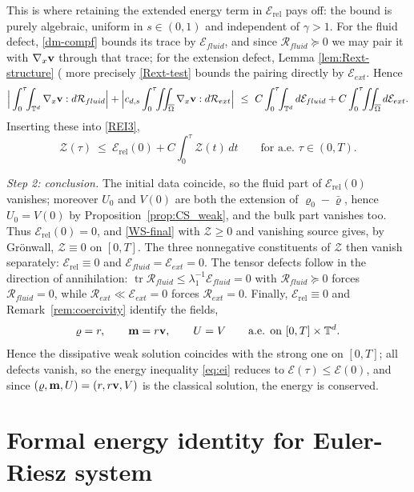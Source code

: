\documentclass[12pt,a4paper,twoside]{article}
\newcommand{\vr}{\varrho}
\newcommand{\vv}{\vc{v}}
\newcommand{\vc}[1]{{\bf #1}}
\newcommand{\Erel}{\mathcal{E}_{\mathrm{rel}}}
\numberwithin{equation}{section}%
\newcommand{\vm}{\vc{m}}
\newcommand{\Gradx}{\nabla_x}
\begin{document}
\begin{pf}
This is where retaining the extended energy term in $\Erel$ pays off: the bound is purely algebraic, uniform in $s\in(0,1)$ and independent of $\gamma>1$. For the fluid defect, \eqref{dm-compf} bounds its trace by
$\mathcal E_{fluid}$, and since $\mathcal R_{fluid}\succeq0$ we may pair it with $\Gradx\vv$ through
that trace; for the extension defect, Lemma \ref{lem:Rext-structure} ( more precisely \eqref{Rext-test} bounds the pairing directly by
$\mathcal E_{ext}$. Hence
\[
\Big|\int_0^\tau\!\!\int_{\mathbb T^d}\Gradx\vv:d\mathcal R_{fluid}\Big|
+\Big|c_{d,s}\int_0^\tau\!\!\iint_{\overline\Omega}\Gradx\vv:d\mathcal R_{ext}\Big|
\ \le\ C\int_0^\tau\!\!\int_{\mathbb T^d}d\mathcal E_{fluid}+C\int_0^\tau\!\!\iint_{\overline\Omega}d\mathcal E_{ext}.
\]
Inserting these into \eqref{REI3},
\begin{equation}\label{WS-final}
	\mathcal Z(\tau)\ \le\ \Erel(0)+C\int_0^\tau\mathcal Z(t)\,dt
	\qquad\text{for a.e. }\tau\in(0,T).
\end{equation}

\emph{Step 2: conclusion.} The initial data coincide, so the fluid part of $\Erel(0)$ vanishes; moreover
$U_0$ and $V(0)$ are both the extension of $\vr_0-\bar\vr$, hence $U_0=V(0)$ by
Proposition~\ref{prop:CS_weak}, and the bulk part vanishes too. Thus $\Erel(0)=0$, and
\eqref{WS-final} with $\mathcal Z\ge0$ and vanishing source gives, by Gr\"onwall,
$\mathcal Z\equiv0$ on $[0,T]$. The three nonnegative constituents of $\mathcal Z$ then vanish
separately: $\Erel\equiv0$ and $\mathcal E_{fluid}=\mathcal E_{ext}=0$. The tensor defects follow in
the direction of annihilation: $\operatorname{tr}\mathcal R_{fluid}\le\lambda_1^{-1}\mathcal E_{fluid}=0$
with $\mathcal R_{fluid}\succeq0$ forces $\mathcal R_{fluid}=0$, while
$\mathcal R_{ext}\ll\mathcal E_{ext}=0$ forces $\mathcal R_{ext}=0$. Finally, $\Erel\equiv0$ and
Remark~\ref{rem:coercivity} identify the fields,
\[
\vr=r,\qquad \vm=r\vv,\qquad U=V\qquad\text{a.e. on }[0,T]\times\mathbb T^d .
\]
Hence the dissipative weak solution coincides with the strong one on $[0,T]$; all defects vanish, so
the energy inequality \eqref{eq:ei} reduces to $\mathcal E(\tau)\le\mathcal E(0)$, and since
$(\vr,\vm,U)=(r,r\vv,V)$ is the classical solution, the energy is conserved. 
\end{pf}


	
	\appendix
	\section{Formal energy identity for Euler-Riesz system}
\label{sec:eng-formal}
	
\end{document}
